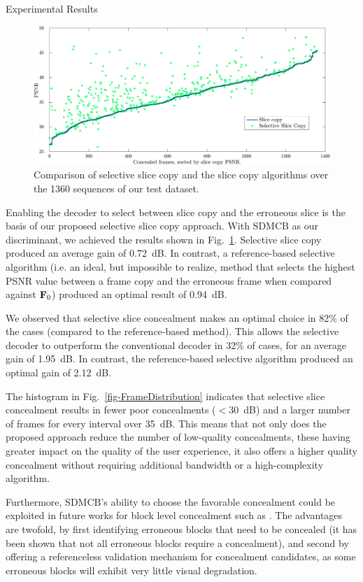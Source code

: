 \documentclass{article}
\begin{document}
\begin{section}{Experimental Results}
\begin{figure}[t]
\centering
\includegraphics[width=\linewidth]{graphics/selectiveSliceCopy.pdf}\vspace{-1em}
\caption{\small{}Comparison of selective slice copy and the slice copy 
algorithms over
the 1360 sequences of our test dataset.}
\label{fig-SelectiveSliceCopy}
\end{figure}


Enabling the decoder to select between slice copy and the erroneous slice is the
basis of our proposed selective slice copy approach. With $\textrm{SDMCB}$ as
our discriminant, we achieved the results shown in
Fig.~\ref{fig-SelectiveSliceCopy}. Selective slice copy produced an average gain
of 0.72~dB. In contrast, a reference-based selective algorithm (i.e. an ideal, 
but impossible to realize, method that selects the highest PSNR value between a 
frame copy and the erroneous frame when
compared against $\mathbf{F}_{0}$) produced an optimal result of 0.94~dB. 

We observed that selective slice concealment makes an optimal choice in
82\% of the cases (compared to the reference-based method). This allows the 
selective decoder to outperform the
conventional decoder in 32\% of cases, for an average gain of 1.95~dB.
In contrast, the reference-based selective algorithm produced an optimal gain of
2.12~dB.

The histogram in Fig.~\ref{fig-FrameDistribution} indicates that selective slice
concealment results in fewer poor concealments (\mbox{$<30$}~dB) and a larger
number of frames for every interval over 35~dB. This means that not only
does the proposed approach reduce the number of low-quality concealments, these
having greater impact on the quality of the user experience, it also offers a
higher quality concealment without requiring additional bandwidth or a 
high-complexity algorithm.

Furthermore, $\textrm{SDMCB}$'s ability to choose the favorable concealment 
could be exploited in future works for block level concealment such as 
\cite{OBMA}.
The advantages are twofold, by first identifying erroneous blocks that need
to be concealed (it has been shown that not all erroneous blocks require a 
concealment), and second by offering a referenceless validation mechanism for 
concealment candidates,
as some erroneous blocks will exhibit very little visual degradation.
\end{section}
\end{document}
